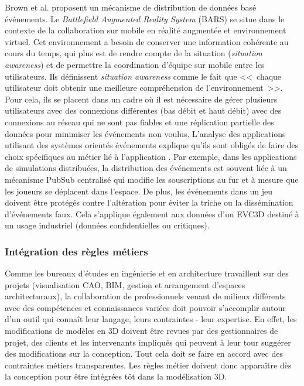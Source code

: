 Brown et al. \cite{Brown2003} proposent un mécanisme de distribution de 
données basé événements. Le \textit{Battlefield Augmented Reality System} 
(BARS) se situe dans le contexte de la collaboration sur mobile en réalité 
augmentée et environnement virtuel. Cet environnement a besoin de conserver 
une information cohérente au cours du temps, qui plus est de rendre compte de la 
situation (\textit{situation awareness}) et de permettre la coordination d'équipe sur 
mobile entre les utilisateurs. Ils définissent \textit{situation awareness} comme le 
fait que <<~chaque utilisateur doit obtenir une meilleure compréhension de 
l'environnement~>>. Pour cela, ils se placent dans un cadre où il est nécessaire 
de gérer plusieurs utilisateurs avec des connexions différentes (bas débit et haut 
débit) avec des connexions au réseau qui ne sont pas fiables et une réplication 
partielle des données pour minimiser les événements non voulus. L'analyse des applications utilisant des 
systèmes orientés événements explique qu'ils sont obligés de faire des choix 
spécifiques au métier lié à l'application 
\cite{Hinze2009}. Par exemple, dans les applications de simulations distribuées, 
la distribution des événements est souvent liée à un mécanisme \gls{PubSub} centralisé qui 
modifie les souscriptions au fur et à mesure que les joueurs se déplacent dans 
l'espace. De plus, les événements dans un jeu doivent être protégés contre 
l'altération pour éviter la triche ou la dissémination d'événements faux. Cela 
s'applique également aux données d'un \gls{EVC3D} destiné à un usage industriel 
(données confidentielles ou critiques).

\subsubsection{Intégration des règles métiers}
Comme les bureaux d'études en ingénierie et en architecture travaillent sur des 
projets (visualisation \gls{CAO}, \gls{BIM}, gestion et arrangement d'espaces 
architecturaux), la collaboration de professionnels venant de milieux différents 
avec des compétences et connaissances variées doit pouvoir s'accomplir autour d'un 
outil qui connaît leur langage, leurs contraintes - leur expertise. En effet, les 
modifications de modèles en \gls{3D} doivent être revues par des gestionnaires de 
projet, des clients et les intervenants impliqués qui peuvent à leur tour suggérer 
des modifications sur la conception. Tout cela doit se faire en accord avec des 
contraintes métiers transparentes.
Les règles métier doivent donc apparaître dès la conception pour être 
intégrées tôt dans la modélisation \gls{3D}. 

